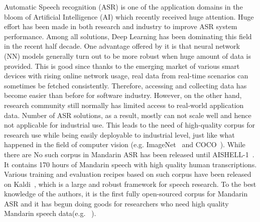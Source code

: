 \documentclass[a4paper]{article}
\begin{document}
Automatic Speech recognition (ASR) is one of the application domains in the bloom of Artificial
Intelligence (AI) which recently received huge attention. Huge effort has been made in both research and industry
to improve ASR system performance. Among all solutions, Deep Learning has been dominating
this field in the recent half decade. One advantage offered by it is that neural network (NN) models generally turn out to be more robust when
huge amount of data is provided. This is good since thanks to the emerging market of various smart devices with rising online network usage, real data from
real-time scenarios can sometimes be fetched consistently. Therefore, accessing and 
collecting data has become easier than before for software industry.
However, on the other hand, research community still normally has limited access to real-world
application data. Number of ASR solutions, as a result, mostly can not scale well and hence not applicable for industrial use. This leads to the need of high-quality corpus for research use while being easily deployable to industrial level, just like what happened in the field of computer vision (e.g. ImageNet~\cite{imagenet} and COCO~\cite{coco}). While there are  No such corpus in Mandarin ASR has been released until AISHELL-1~\cite{aishell1}.
It contains 170 hours of Mandarin speech with high quality human transcriptions. Various training and evaluation recipes based on such corpus have been released on Kaldi~\cite{kaldi}, which is a large and robust framework for speech research. To the best knowledge of the authors, it is the first fully open-sourced corpus for Mandarin ASR and
it has begun doing goods for researchers who need high quality Mandarin speech data(e.g. ~\cite{do2017}).

\end{document}
